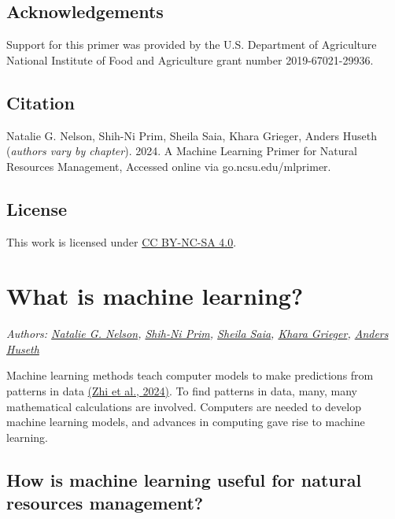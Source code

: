 \documentclass[
]{book}
\begin{document}
\hypertarget{acknowledgements}{%
\section{Acknowledgements}\label{acknowledgements}}

Support for this primer was provided by the U.S. Department of Agriculture National Institute of Food and Agriculture grant number 2019-67021-29936.

\hypertarget{citation}{%
\section{Citation}\label{citation}}

Natalie G. Nelson, Shih-Ni Prim, Sheila Saia, Khara Grieger, Anders Huseth (\emph{authors vary by chapter}). 2024. A Machine Learning Primer for Natural Resources Management, Accessed online via go.ncsu.edu/mlprimer.

\hypertarget{license}{%
\section{License}\label{license}}

This work is licensed under \href{https://creativecommons.org/licenses/by-nc-sa/4.0/?ref=chooser-v1}{CC BY-NC-SA 4.0}.

\hypertarget{what-is-machine-learning}{%
\chapter{What is machine learning?}\label{what-is-machine-learning}}

\emph{Authors: \href{https://bae.ncsu.edu/people/nnelson4/}{Natalie G. Nelson}, \href{https://www.linkedin.com/in/shih-ni-prim-14033336/}{Shih-Ni Prim}, \href{https://sheilasaia.rbind.io/}{Sheila Saia}, \href{https://cals.ncsu.edu/applied-ecology/people/kdgriege/}{Khara Grieger}, \href{https://cals.ncsu.edu/entomology-and-plant-pathology/people/ashuseth/}{Anders Huseth}}

Machine learning methods teach computer models to make predictions from patterns in data \href{https://doi.org/10.1038/s44221-024-00202-z}{(Zhi et al., 2024)}. To find patterns in data, many, many mathematical calculations are involved. Computers are needed to develop machine learning models, and advances in computing gave rise to machine learning.

\hypertarget{how-is-machine-learning-useful-for-natural-resources-management}{%
\section{How is machine learning useful for natural resources management?}\label{how-is-machine-learning-useful-for-natural-resources-management}}
\end{document}
